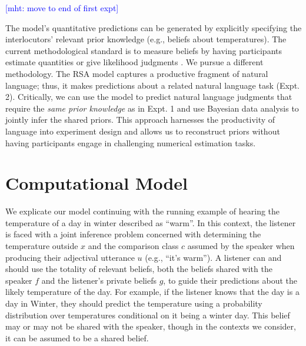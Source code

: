 \documentclass[doc]{apa6}
\begin{document}

\textcolor{Blue}{[mht: move to end of first expt]}

The model's quantitative predictions can be generated by explicitly
specifying the interlocutors' relevant prior knowledge (e.g., beliefs
about temperatures). The current methodological standard is to measure
beliefs by having participants estimate quantities or give likelihood
judgments \cite{Franke2016}. We pursue a different methodology. The
RSA model captures a productive fragment of natural language; thus, it
makes predictions about a related natural language task (Expt. 2).
Critically, we can use the model to predict natural language judgments
that require the \emph{same prior knowledge} as in Expt. 1 and use
Bayesian data analysis to jointly infer the shared priors. This approach
harnesses the productivity of language into experiment design and allows
us to reconstruct priors without having participants engage in
challenging numerical estimation tasks.

\section{Computational Model}

We explicate our model continuing with the running example of hearing the temperature of a day in winter described as ``warm''. 
In this context, the listener is faced with a joint inference problem concerned with determining the temperature outside $x$ and the comparison class  $c$ assumed by the speaker when producing their adjectival utterance $u$ (e.g., ``it's warm'').
A listener can and should use the totality of relevant beliefs, both the beliefs shared with the speaker $f$ and the listener's private beliefs $g$, to guide their predictions about the likely temperature of the day. 
For example, if the listener knows that the day is a day in Winter, they should predict the temperature using a probability distribution over temperatures conditional on it being a winter day.
This belief may or may not be shared with the speaker, though in the contexts we consider, it can be assumed to be a shared belief.
\end{document}
